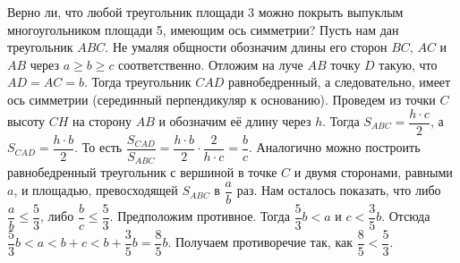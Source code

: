 \problem
Верно ли, что любой треугольник площади 3 можно покрыть выпуклым
многоугольником площади 5, имеющим ось симметрии?
\solution
Пусть нам дан треугольник $ABC$.
Не умаляя общности обозначим длины его сторон $BC$, $AC$ и $AB$ через
$a \geq b \geq c$ соответственно.
Отложим на луче $AB$ точку $D$ такую, что $AD = AC = b$.
Тогда треугольник $CAD$ равнобедренный, а следовательно, имеет ось симметрии
(серединный перпендикуляр к основанию).
Проведем из точки $C$ высоту $CH$ на сторону $AB$ и обозначим её длину через
$h$.
Тогда $S_{ABC} = \dfrac{h \cdot c}{2}$, а $S_{CAD} = \dfrac{h \cdot b}{2}$.
То есть
\(
    \dfrac{S_{CAD}}{S_{ABC}}
=
    \dfrac{h \cdot b}{2} \cdot \dfrac{2}{h \cdot c}
=
    \dfrac{b}{c}
\).
Аналогично можно построить равнобедренный треугольник с вершиной в точке $C$ и
двумя сторонами, равными $a$, и площадью, превосходящей $S_{ABC}$ в
$\dfrac{a}{b}$ раз.
Нам осталось показать, что либо $\dfrac{a}{b} \leq \dfrac{5}{3}$, либо
$\dfrac{b}{c} \leq \dfrac{5}{3}$.
Предположим противное.
Тогда $\dfrac{5}{3} b < a$ и $c < \dfrac{3}{5} b$.
Отсюда $\dfrac{5}{3} b < a < b + c < b + \dfrac{3}{5} b = \dfrac{8}{5} b$.
Получаем противоречие так, как $\dfrac{8}{5} < \dfrac{5}{3}$.
\endproblem
